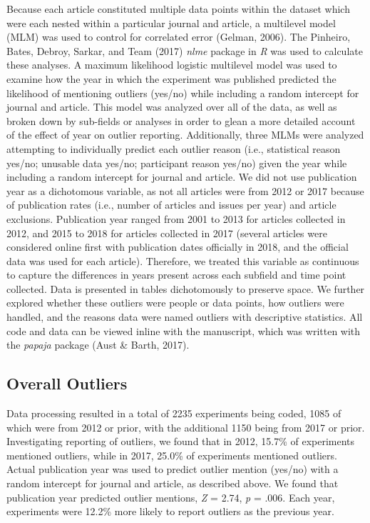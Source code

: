 \documentclass[english,,man,mask]{apa6}
\theoremstyle{definition}
\theoremstyle{definition}
\theoremstyle{definition}
\theoremstyle{remark}
\begin{document}
Because each article constituted multiple data points within the dataset
which were each nested within a particular journal and article, a
multilevel model (MLM) was used to control for correlated error (Gelman,
2006). The Pinheiro, Bates, Debroy, Sarkar, and Team (2017) \emph{nlme}
package in \emph{R} was used to calculate these analyses. A maximum
likelihood logistic multilevel model was used to examine how the year in
which the experiment was published predicted the likelihood of
mentioning outliers (yes/no) while including a random intercept for
journal and article. This model was analyzed over all of the data, as
well as broken down by sub-fields or analyses in order to glean a more
detailed account of the effect of year on outlier reporting.
Additionally, three MLMs were analyzed attempting to individually
predict each outlier reason (i.e., statistical reason yes/no; unusable
data yes/no; participant reason yes/no) given the year while including a
random intercept for journal and article. We did not use publication
year as a dichotomous variable, as not all articles were from 2012 or
2017 because of publication rates (i.e., number of articles and issues
per year) and article exclusions. Publication year ranged from 2001 to
2013 for articles collected in 2012, and 2015 to 2018 for articles
collected in 2017 (several articles were considered online first with
publication dates officially in 2018, and the official data was used for
each article). Therefore, we treated this variable as continuous to
capture the differences in years present across each subfield and time
point collected. Data is presented in tables dichotomously to preserve
space. We further explored whether these outliers were people or data
points, how outliers were handled, and the reasons data were named
outliers with descriptive statistics. All code and data can be viewed
inline with the manuscript, which was written with the \emph{papaja}
package (Aust \& Barth, 2017).

\subsection{Overall Outliers}\label{overall-outliers}

Data processing resulted in a total of 2235 experiments being coded,
1085 of which were from 2012 or prior, with the additional 1150 being
from 2017 or prior. Investigating reporting of outliers, we found that
in 2012, 15.7\% of experiments mentioned outliers, while in 2017, 25.0\%
of experiments mentioned outliers. Actual publication year was used to
predict outlier mention (yes/no) with a random intercept for journal and
article, as described above. We found that publication year predicted
outlier mentions, \emph{Z} = 2.74, \emph{p} = .006. Each year,
experiments were 12.2\% more likely to report outliers as the previous
year.
\end{document}
